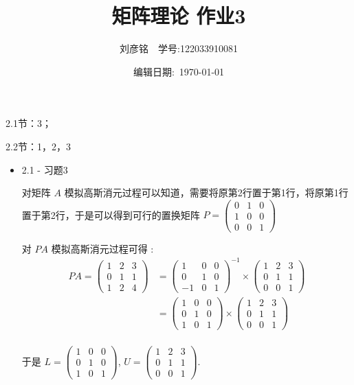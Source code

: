 \documentclass{article}
\title{矩阵理论 作业3}
\author{刘彦铭\ \ 学号:122033910081}
\date{编辑日期:\ \today}
\begin{document}
\maketitle

2.1节：3；

2.2节：1，2，3

\begin{spacing}{1.5}
\begin{itemize}

    \item 2.1 - 习题3
    
    对矩阵 $A$ 模拟高斯消元过程可以知道，需要将原第2行置于第1行，将原第1行置于第2行，于是可以得到可行的置换矩阵 $P = \left(\begin{array}{ccc}0&1&0\\1&0&0\\0&0&1\end{array}\right)$
    
    对 $PA$ 模拟高斯消元过程可得 :
    $$
    \begin{array}{ll}
        PA = \left(\begin{array}{ccc}1&2&3\\0&1&1\\1&2&4\end{array}\right)
           &= \left(\begin{array}{ccc}1&0&0\\0&1&0\\-1&0&1\end{array}\right)^{-1}\times 
              \left(\begin{array}{ccc}1&2&3\\0&1&1\\0&0&1\end{array}\right)\\
           &= \left(\begin{array}{ccc}1&0&0\\0&1&0\\1&0&1\end{array}\right)\times 
              \left(\begin{array}{ccc}1&2&3\\0&1&1\\0&0&1\end{array}\right)\\
    \end{array}
    $$

    于是 $L = \left(\begin{array}{ccc}1&0&0\\0&1&0\\1&0&1\end{array}\right)$, $U=\left(\begin{array}{ccc}1&2&3\\0&1&1\\0&0&1\end{array}\right)$.


\end{itemize}
\end{spacing}
\end{document}
